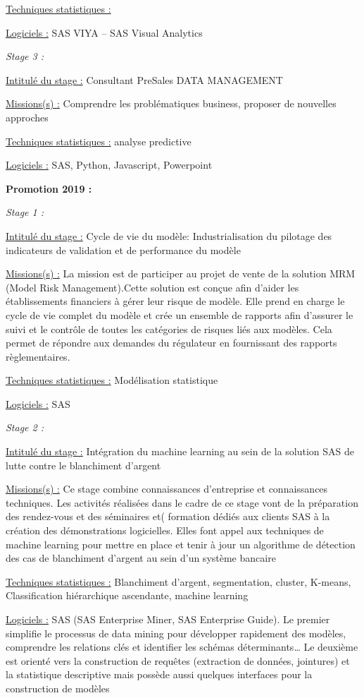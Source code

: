 \documentclass[
  letterpaper,
  DIV=11,
  numbers=noendperiod]{scrreprt}
\begin{document}
\uline{Techniques statistiques :}

\uline{Logiciels :} SAS VIYA -- SAS Visual Analytics

\emph{Stage 3 :}

\uline{Intitulé du stage :} Consultant PreSales DATA MANAGEMENT

\uline{Missions(s) :} Comprendre les problématiques business, proposer
de nouvelles approches

\uline{Techniques statistiques :} analyse predictive

\uline{Logiciels :} SAS, Python, Javascript, Powerpoint

\textbf{Promotion 2019 :}

\emph{Stage 1 :}

\uline{Intitulé du stage :} Cycle de vie du modèle: Industrialisation du
pilotage des indicateurs de validation et de performance du modèle

\uline{Missions(s) :} La mission est de participer au projet de vente de
la solution MRM (Model Risk Management).Cette solution est conçue afin
d'aider les établissements financiers à gérer leur risque de modèle.
Elle prend en charge le cycle de vie complet du modèle et crée un
ensemble de rapports afin d'assurer le suivi et le contrôle de toutes
les catégories de risques liés aux modèles. Cela permet de répondre aux
demandes du régulateur en fournissant des rapports règlementaires.

\uline{Techniques statistiques :} Modélisation statistique

\uline{Logiciels :} SAS

\emph{Stage 2 :}

\uline{Intitulé du stage :} Intégration du machine learning au sein de
la solution SAS de lutte contre le blanchiment d'argent

\uline{Missions(s) :} Ce stage combine connaissances d'entreprise et
connaissances techniques. Les activités réalisées dans le cadre de ce
stage vont de la préparation des rendez-vous et des séminaires et(
formation dédiés aux clients SAS à la création des démonstrations
logicielles. Elles font appel aux techniques de machine learning pour
mettre en place et tenir à jour un algorithme de détection des cas de
blanchiment d'argent au sein d'un système bancaire

\uline{Techniques statistiques :} Blanchiment d'argent, segmentation,
cluster, K-means, Classification hiérarchique ascendante, machine
learning

\uline{Logiciels :} SAS (SAS Enterprise Miner, SAS Enterprise Guide). Le
premier simplifie le processus de data mining pour développer rapidement
des modèles, comprendre les relations clés et identifier les schémas
déterminants\ldots{} Le deuxième est orienté vers la construction de
requêtes (extraction de données, jointures) et la statistique
descriptive mais possède aussi quelques interfaces pour la construction
de modèles
\end{document}
